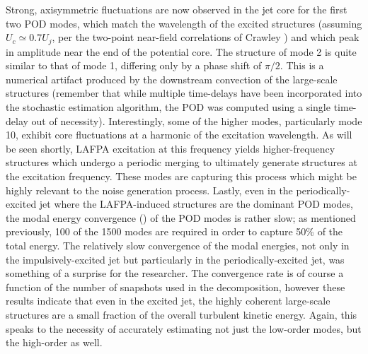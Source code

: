 Strong, axisymmetric fluctuations are now observed in the jet core for the first two POD modes, which match the wavelength of the excited structures (assuming $U_c \simeq 0.7 U_j$, per the two-point near-field correlations of Crawley \etal \citep{Crawley2015}) and which peak in amplitude near the end of the potential core.
The structure of mode 2 is quite similar to that of mode 1, differing only by a phase shift of $\pi/2$. 
This is a numerical artifact produced by the downstream convection of the large-scale structures (remember that while multiple time-delays have been incorporated into the stochastic estimation algorithm, the POD was computed using a single time-delay out of necessity).
Interestingly, some of the higher modes, particularly mode 10, exhibit core fluctuations at a harmonic of the excitation wavelength.
As will be seen shortly, LAFPA excitation at this frequency yields higher-frequency structures which undergo a periodic merging to ultimately generate structures at the excitation frequency. 
These modes are capturing this process which might be highly relevant to the noise generation process. 
Lastly, even in the periodically-excited jet where the LAFPA-induced structures are the dominant POD modes, the modal energy convergence () of the POD modes is rather slow; as mentioned previously, 100 of the 1500 modes are required in order to capture 50\% of the total energy.
The relatively slow convergence of the modal energies, not only in the impulsively-excited jet but particularly in the periodically-excited jet, was something of a surprise for the researcher.
The convergence rate is of course a function of the number of snapshots used in the decomposition, however these results indicate that even in the excited jet, the highly coherent large-scale structures are a small fraction of the overall turbulent kinetic energy.
Again, this speaks to the necessity of accurately estimating not just the low-order modes, but the high-order as well.
